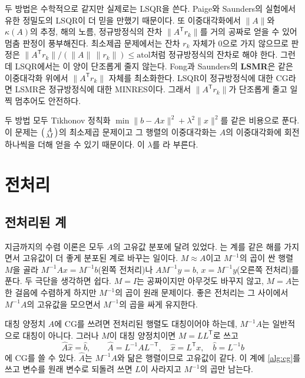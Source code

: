 두 방법은 수학적으로 같지만 실제로는 LSQR을 쓴다. Paige와 Saunders의 실험에서 유한 정밀도의 LSQR이 더 믿을 만했기 때문이다. 또 이중대각화에서 $\|A\|$와 $\kappa(A)$의 추정, 해의 노름, 정규방정식의 잔차 $\|A^{\mathsf T}r_k\|$를 거의 공짜로 얻을 수 있어 멈춤 판정이 풍부해진다. 최소제곱 문제에서는 잔차 $r_k$ 자체가 $0$으로 가지 않으므로 판정은 $\|A^{\mathsf T}r_k\|/(\|A\|\,\|r_k\|)\le\mathrm{atol}$처럼 정규방정식의 잔차로 해야 한다. 그런데 LSQR에서는 이 양이 단조롭게 줄지 않는다. Fong과 Saunders의 \textbf{LSMR}은 같은 이중대각화 위에서 $\|A^{\mathsf T}r_k\|$ 자체를 최소화한다\cite{fong2011lsmr}. LSQR이 정규방정식에 대한 CG라면 LSMR은 정규방정식에 대한 MINRES이다. 그래서 $\|A^{\mathsf T}r_k\|$가 단조롭게 줄고 일찍 멈추어도 안전하다.

두 방법 모두 Tikhonov 정칙화 $\min\|b-Ax\|^2+\lambda^2\|x\|^2$를 같은 비용으로 푼다. 이 문제는 $\begin{psmallmatrix}A\\\lambda I\end{psmallmatrix}$의 최소제곱 문제이고 그 행렬의 이중대각화는 $A$의 이중대각화에 회전 하나씩을 더해 얻을 수 있기 때문이다. 이 $\lambda$를 라 부른다.

\section{전처리}
\label{sec:preconditioning}

\subsection{전처리된 계}

지금까지의 수렴 이론은 모두 $A$의 고유값 분포에 달려 있었다. 는 계를 같은 해를 가지면서 고유값이 더 좋게 분포된 계로 바꾸는 일이다. $M\approx A$이고 $M^{-1}$의 곱이 싼 행렬 $M$을 골라 $M^{-1}Ax=M^{-1}b$(왼쪽 전처리)나 $AM^{-1}y=b$, $x=M^{-1}y$(오른쪽 전처리)를 푼다. 두 극단을 생각하면 쉽다. $M=I$는 공짜이지만 아무것도 바꾸지 않고, $M=A$는 한 걸음에 수렴하게 하지만 $M^{-1}$의 곱이 원래 문제이다. 좋은 전처리는 그 사이에서 $M^{-1}A$의 고유값을 모으면서 $M^{-1}$의 곱을 싸게 유지한다.

대칭 양정치 $A$에 CG를 쓰려면 전처리된 행렬도 대칭이어야 하는데, $M^{-1}A$는 일반적으로 대칭이 아니다. 그러나 $M$이 대칭 양정치이면 $M=LL^{\mathsf T}$로 쓰고 
\[
\hat A\hat x=\hat b,\qquad\hat A=L^{-1}AL^{-\mathsf T},\quad\hat x=L^{\mathsf T}x,\quad\hat b=L^{-1}b
\]
에 CG를 쓸 수 있다. $\hat A$는 $M^{-1}A$와 닮은 행렬이므로 고유값이 같다. 이 계에 \cref{alg:cg}를 쓰고 변수를 원래 변수로 되돌려 쓰면 $L$이 사라지고 $M^{-1}$의 곱만 남는다.

